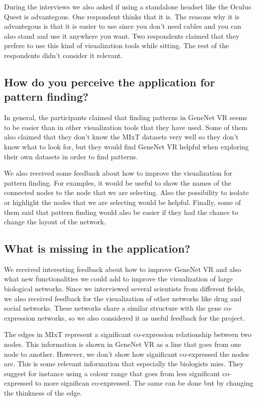 During the interviews we also asked if using a standalone headset like the Oculus Quest is advantegous. One respondent thinks that it is. The reasons why it is advantegous is that it is easier to use since you don't need cables and you can also stand and use it anywhere you want. Two respondents claimed that they prefere to use this kind of visualization tools while sitting. The rest of the respondents didn't consider it relevant.

\subsection{How do you perceive the application for pattern finding?}
In general, the participants claimed that finding patterns in GeneNet VR seems to be easier than in other visualization tools that they have used. Some of them also claimed that they don't know the MIxT datasets very well so they don't know what to look for, but they would find GeneNet VR helpful when exploring their own datasets in order to find patterns.

We also received some feedback about how to improve the visualization for pattern finding. For examples, it would be useful to show the names of the connected nodes to the node that we are selecting. Also the possibility to isolate or highlight the nodes that we are selecting would be helpful. Finally, some of them said that pattern finding would also be easier if they had the chance to change the layout of the network.

\subsection{What is missing in the application?}
We received interesting feedback about how to improve GeneNet VR and also what new functionalities we could add to improve the visualization of large biological networks. Since we interviewed several scientists from different fields, we also received feedback for the visualization of other networks like drug and social networks. These networks share a similar structure with the gene co-expression networks, so we also considered it as useful feedback for the project.

The edges in MIxT represent a significant co-expression relationship between two nodes. This information is shown in GeneNet VR as a line that goes from one node to another. However, we don't show how significant co-expressed the nodes are. This is some relevant information that especially the biologists miss. They suggest for instance using a colour range that goes from less significant co-expressed to more significan co-expressed. The same can be done but by changing the thinkness of the edge.

